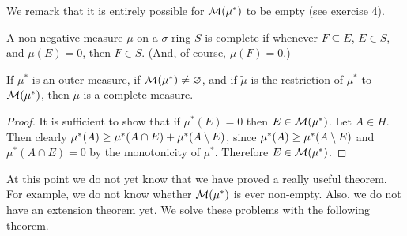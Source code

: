 We remark that it is entirely possible for ${\cal M}(\mu^*)$ to be empty (see exercise 4).

\begin{definition}
A non-negative measure $\mu$ on a $\sigma$-ring ${S}$ is \underline{complete} if whenever $F \subseteq E$, $E \in S$, and $\mu(E)=0$, then $F \in S $. (And, of course, $\mu(F)=0$.)
\end{definition}

\begin{proposition}
If $\mu^*$ is an outer measure, if ${\cal M}(\mu^*) \neq \varnothing$, and if $\tilde{\mu}$ is the restriction of $\mu^*$ to ${\cal M}(\mu^*)$, then $\tilde{\mu}$ is a complete measure.
\end{proposition}

\begin{proof}
It is sufficient to show that if $\mu^*(E)=0$ then $E \in {\cal M}(\mu^*)$. Let $A \in H$. Then clearly $\mu^*(A) \geq \mu^*(A \cap E)+\mu^*(A\setminus E)$, since $\mu^*(A) \geq \mu^*(A\setminus E)$ and $\mu^*(A \cap E)=0$ by the monotonicity of $\mu^*$. Therefore $E \in {\cal M}(\mu^*)$.
\end{proof}

At this point we do not yet know that we have proved a really useful theorem. For example, we do not know whether ${\cal M}(\mu^*)$ is ever non-empty. Also, we do not have an extension theorem yet. We solve these problems with the following theorem.

